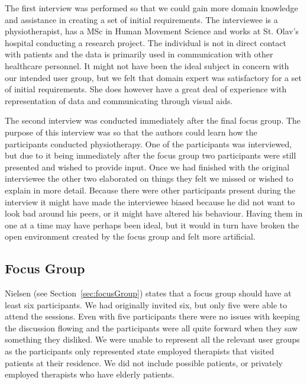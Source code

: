 The first interview was performed so that we could gain more domain knowledge and assistance in creating a set of initial requirements. The interviewee is a physiotherapist, has a MSc in Human Movement Science and works at St. Olav's hospital conducting a research project. The individual is not in direct contact with patients and the data is primarily used in communication with other healthcare personnel. It might not have been the ideal subject in concern with our intended user group, but we felt that domain expert was satisfactory for a set of initial requirements. She does however have a great deal of experience with representation of data and communicating through visual aids.

The second interview was conducted immediately after the final focus group. The purpose of this interview was so that the authors could learn how the participants conducted physiotherapy. One of the participants was interviewed, but due to it being immediately after the focus group two participants were still presented and wished to provide input. Once we had finished with the original interviewee the other two elaborated on things they felt we missed or wished to explain in more detail. Because there were other participants present during the interview it might have made the interviewee biased because he did not want to look bad around his peers, or it might have altered his behaviour. Having them in one at a time may have perhaps been ideal, but it would in turn have broken the open environment created by the focus group and felt more artificial.

\subsection{Focus Group}
Nielsen (see Section~\ref{sec:focusGroup}) states that a focus group should have at least six participants. We had originally invited six, but only five were able to attend the sessions. Even with five participants there were no issues with keeping the discussion flowing and the participants were all quite forward when they saw something they disliked. We were unable to represent all the relevant user groups as the participants only represented state employed therapists that visited patients at their residence. We did not include possible patients, or privately employed therapists who have elderly patients.

